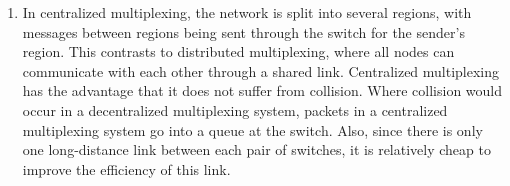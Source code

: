 \documentclass{article}
\begin{document}
\begin{enumerate}
\begin{enumerate}
      \item Use a faster incoming link.
      \item If packets can be propagated at the speed of light, the maximum propagation delay is about $\frac{\SI{5e2}{m}}{\SI{3e8}{m/s}}$, or \SI{1.67e-6}{s}.
    \end{enumerate}
  \item In centralized multiplexing, the network is split into several regions, with messages between regions being sent through the switch for the sender's region. This contrasts to distributed multiplexing, where all nodes can communicate with each other through a shared link. Centralized multiplexing has the advantage that it does not suffer from collision. Where collision would occur in a decentralized multiplexing system, packets in a centralized multiplexing system go into a queue at the switch. Also, since there is only one long-distance link between each pair of switches, it is relatively cheap to improve the efficiency of this link.
\end{enumerate}
\end{document}
